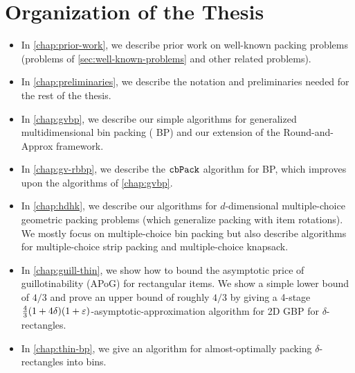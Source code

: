 \section{Organization of the Thesis}

\begin{itemize}
\item In \cref{chap:prior-work}, we describe prior work on well-known packing problems
    (problems of \cref{sec:well-known-problems} and other related problems).
\item In \cref{chap:preliminaries}, we describe the notation and preliminaries
    needed for the rest of the thesis.
\item In \cref{chap:gvbp}, we describe our simple algorithms for generalized multidimensional
    bin packing ( BP) and our extension of the Round-and-Approx framework.
\item In \cref{chap:gv-rbbp}, we describe the $\operatorname{\mathtt{cbPack}}$ algorithm for  BP,
    which improves upon the algorithms of \cref{chap:gvbp}.
\item In \cref{chap:hdhk}, we describe our algorithms for $d$-dimensional
    multiple-choice geometric packing problems (which generalize packing with item rotations).
    We mostly focus on multiple-choice bin packing but also describe algorithms for
    multiple-choice strip packing and multiple-choice knapsack.
\item In \cref{chap:guill-thin}, we show how to bound the asymptotic price of guillotinability
    (APoG) for \thin{} rectangular items. We show a simple lower bound of $4/3$ and prove an
    upper bound of roughly $4/3$ by giving a 4-stage
    $\frac{4}{3}(1+4\delta)(1+\varepsilon)$-asymptotic-approximation algorithm for 2D GBP
    for $\delta$-\thin{} rectangles.
\item In \cref{chap:thin-bp}, we give an algorithm for almost-optimally packing
    $\delta$-\thin{} rectangles into bins.
\end{itemize}
